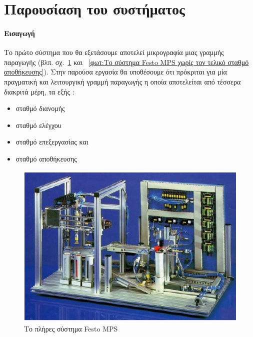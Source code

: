 \documentclass[a4paper,12pt,twoside]{report}
\begin{document}
{		\section{Παρουσίαση του συστήματος}
		
			\paragraph{Εισαγωγή} {Το πρώτο σύστημα που θα εξετάσουμε αποτελεί μικρογραφία μιας γραμμής παραγωγής {\footnotesize (βλπ. σχ.~\ref{φωτ:Το πλήρες σύστημα Festo MPS} και ~\ref{φωτ:Το σύστημα Festo MPS χωρίς τον τελικό σταθμό αποθήκευσης})}. Στην παρούσα εργασία θα υποθέσουμε ότι πρόκριται για μία πραγματική και λειτουργική γραμμή παραγωγής η οποία αποτελείται από τέσσερα διακριτά μέρη, τα εξής :
			}
			\begin{itemize}
				\item σταθμό διανομής
				\item σταθμό ελέγχου
				\item σταθμό επεξεργασίας και
				\item σταθμό αποθήκευσης
			\end{itemize}
			
			\begin{figure}[hp]
					\centering
					\includegraphics[scale=0.75]{FestoMPSSystem2.png}
					\caption{Το πλήρες σύστημα Festo MPS\textregistered}
					\label{φωτ:Το πλήρες σύστημα Festo MPS}
			\end{figure}
			
}
\end{document}
